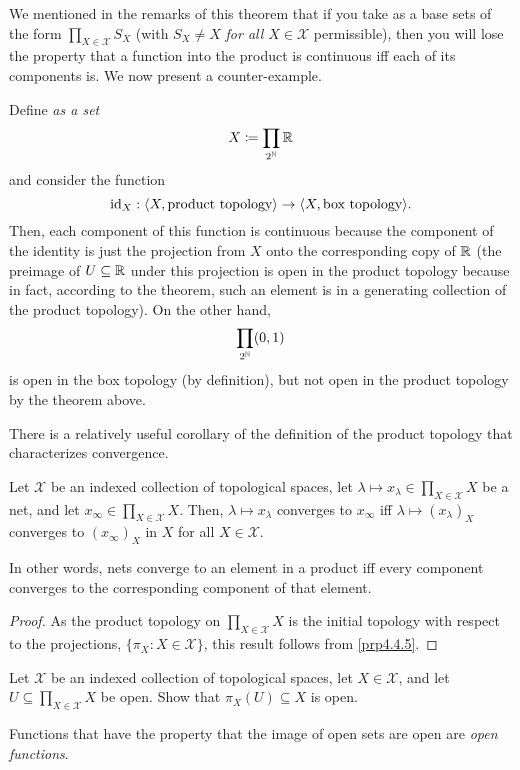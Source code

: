 We mentioned in the remarks of this theorem that if you take as a base sets of the form $\prod _{X\in \mathcal{X}}S_X$ (with $S_X\neq X$ \emph{for all $X\in \mathcal{X}$} permissible), then you will lose the property that a function into the product is continuous iff each of its components is.  We now present a counter-example.
\begin{exm}\label{exm4.5.20}
Define \emph{as a set}
\begin{equation}
X\coloneqq \prod _{2^{\mathbb{N}}}\mathbb{R} 
\end{equation}
and consider the function
\begin{equation}
\operatorname{id} _X:\langle X,\text{product topology}\rangle\rightarrow \langle X,\text{box topology}\rangle.
\end{equation}
Then, each component of this function is continuous because the component of the identity is just the projection from $X$ onto the corresponding copy of $\mathbb{R}$ (the preimage of $U\subseteq \mathbb{R}$ under this projection is open in the product topology because in fact, according to the theorem, such an element is in a generating collection of the product topology).  On the other hand,
\begin{equation}
\prod _{2^{\mathbb{N}}}(0,1)
\end{equation}
is open in the box topology (by definition), but not open in the product topology by the theorem above.
\end{exm}
There is a relatively useful corollary of the definition of the product topology that characterizes convergence.
\begin{crl}\label{crl4.5.15}
Let $\mathcal{X}$ be an indexed collection of topological spaces, let $\lambda \mapsto x_\lambda \in \prod _{X\in \mathcal{X}}X$ be a net, and let $x_\infty \in \prod _{X\in \mathcal{X}}X$.  Then, $\lambda \mapsto x_\lambda$ converges to $x_\infty$ iff $\lambda \mapsto (x_\lambda )_X$ converges to $(x_\infty )_X$ in $X$ for all $X\in \mathcal{X}$.
\begin{rmk}
In other words, nets converge to an element in a product iff every component converges to the corresponding component of that element.
\end{rmk}
\begin{proof}
As the product topology on $\prod _{X\in \mathcal{X}}X$ is the initial topology with respect to the projections, $\{ \pi _X:X\in \mathcal{X}\}$, this result follows from \cref{prp4.4.5}.
\end{proof}
\end{crl}
\begin{exr}\label{ProjectionsAreOpen}
Let $\mathcal{X}$ be an indexed collection of topological spaces, let $X\in \mathcal{X}$, and let $U\subseteq \prod _{X\in \mathcal{X}}X$ be open.  Show that $\pi _X(U)\subseteq X$ is open.
\begin{rmk}
Functions that have the property that the image of open sets are open are \emph{open functions}.
\end{rmk}
\end{exr}


